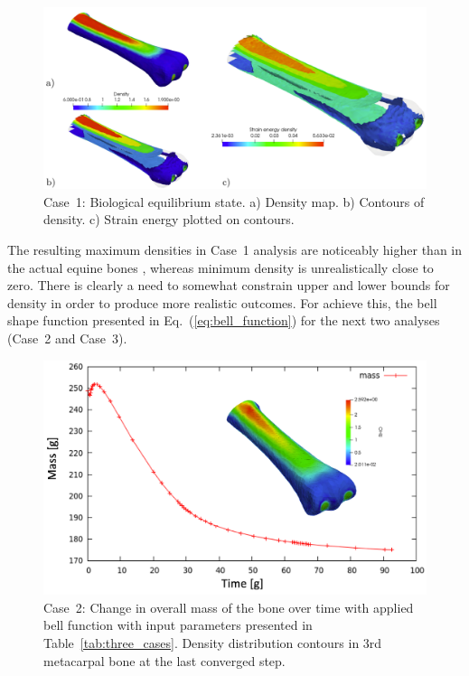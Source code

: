\documentclass[11pt]{acmeArticle}
\numberwithin{equation}{section}
\begin{document}
\begin{figure}[h!]
	\begin{centering}
		\includegraphics[width=12cm]{Figures/mc3_biol_eq.png}
		\caption{Case~1: Biological equilibrium state. a) Density map. b) Contours of density. c) Strain energy plotted on contours.}
		\label{fig:mc3_biol_eq}
	\end{centering}
\end{figure}

The resulting maximum densities in Case~1 analysis are noticeably higher than in the actual equine bones \citep{yamada2015experimental}, whereas minimum density is unrealistically close to zero. 
There is clearly a need to somewhat constrain upper and lower bounds for density in order to produce more realistic outcomes.
For achieve this, the bell shape function presented in Eq.~(\ref{eq:bell_function}) for the next two analyses (Case~2 and Case~3). 

\begin{figure}[h!]
	\begin{centering}
		\includegraphics[width=15cm]{Figures/graphs/density_bell1.png}
		\caption{Case~2: Change in overall mass of the bone over time with applied bell function with input parameters presented in Table~\ref{tab:three_cases}. Density distribution contours in 3rd metacarpal bone at the last converged step.}
		\label{fig:density_bell1}
	\end{centering}
\end{figure}
\end{document}
